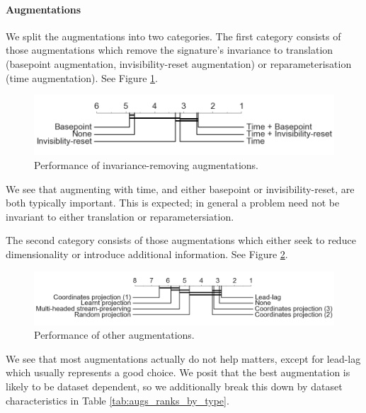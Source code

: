 \documentclass{article}
\theoremstyle{definition}
\theoremstyle{remark}
\begin{document}
	\paragraph{Augmentations}
	We split the augmentations into two categories. The first category consists of those augmentations which remove the signature's invariance to translation (basepoint augmentation, invisibility-reset augmentation) or reparameterisation (time augmentation). See Figure \ref{fig:basic_augs}.

	\begin{figure}[h]
	  	\centering
	  	\vspace{-1em}
  		\includegraphics[width=0.5\linewidth]{images/basic_augs.png}
  		\caption{Performance of invariance-removing augmentations.}
  		\label{fig:basic_augs}
	\end{figure}
	
	We see that augmenting with time, and either basepoint or invisibility-reset, are both typically important. This is expected; in general a problem need not be invariant to either translation or reparametersiation.
	
	The second category consists of those augmentations which either seek to reduce dimensionality or introduce additional information. See Figure \ref{fig:all_augs}.
	
	\begin{figure}[h]
	  	\centering
	  	\vspace{-1em}
  		\includegraphics[width=0.65\linewidth]{images/all_augs.png}
  		\caption{Performance of other augmentations.}
  		\label{fig:all_augs}
	\end{figure}
	
	We see that most augmentations actually do not help matters, except for lead-lag which usually represents a good choice. We posit that the best augmentation is likely to be dataset dependent, so we additionally break this down by dataset characteristics in Table \ref{tab:augs_ranks_by_type}.
\end{document}
